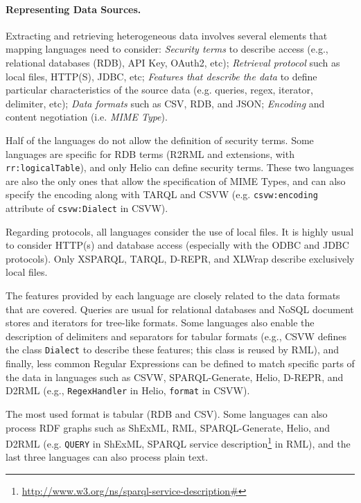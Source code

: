 \noindent\paragraph{\textbf{Representing Data Sources.}} Extracting and retrieving heterogeneous data involves several elements that mapping languages need to consider: \textit{Security terms} to describe access (e.g., relational databases (RDB), API Key, OAuth2, etc); \textit{Retrieval protocol} such as local files, HTTP(S), JDBC, etc; \textit{Features that describe the data} to define particular characteristics of the source data (e.g. queries, regex, iterator, delimiter, etc); \textit{Data formats} such as CSV, RDB, and JSON; \textit{Encoding} and content negotiation (i.e. \textit{MIME Type}). 

Half of the languages do not allow the definition of security terms. Some languages are specific for RDB terms (R2RML and extensions, with \texttt{rr:logical\-Table}), and only Helio can define security terms. These two languages are also the only ones that allow the specification of MIME Types, and can also specify the encoding along with TARQL and CSVW (e.g. \texttt{csvw:encoding} attribute of \texttt{csvw:Dialect} in CSVW). 

Regarding protocols, all languages consider the use of local files. It is highly usual to consider HTTP(s) and database access (especially with the ODBC and JDBC protocols). Only XSPARQL, TARQL, D-REPR, and XLWrap describe exclusively local files. 

The features provided by each language are closely related to the data formats that are covered. Queries are usual for relational databases and NoSQL document stores and iterators for tree-like formats. Some languages also enable the description of delimiters and separators for tabular formats (e.g., CSVW defines the class \texttt{Dialect} to describe these features; this class is reused by RML), and finally, less common Regular Expressions can be defined to match specific parts of the data in languages such as CSVW, SPARQL-Generate, Helio, D-REPR, and D2RML (e.g., \texttt{RegexHandler} in Helio, \texttt{format} in CSVW). 

The most used format is tabular (RDB and CSV). Some languages can also process RDF graphs such as ShExML, RML, SPARQL-Generate, Helio, and D2RML (e.g. \texttt{QUERY} in ShExML,  SPARQL service description\footnote{\url{http://www.w3.org/ns/sparql-service-description\#}} in RML), and the last three languages can also process plain text.


